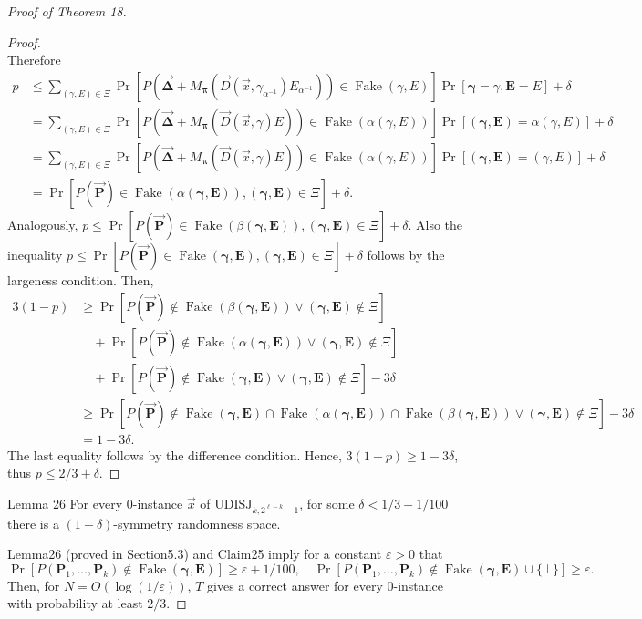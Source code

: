 \begin{proof}[Proof of Theorem 18]
\begin{proof}
\[\]
Therefore
\begin{align*}
p&\le\sum_{(\gamma,E)\in\Xi}\Pr[P(\boldsymbol{\vec\Delta}+M_{\boldsymbol\pi}(\vec D(\vec x,\gamma_{\alpha^{-1}})E_{\alpha^{-1}}))\in\operatorname{Fake}(\gamma,E)]\Pr[\boldsymbol\gamma=\gamma,\mathbf E=E]+\delta\\
&=\sum_{(\gamma,E)\in\Xi}\Pr[P(\boldsymbol{\vec\Delta}+M_{\boldsymbol\pi}(\vec D(\vec x,\gamma)E))\in\operatorname{Fake}(\alpha(\gamma,E))]\Pr[(\boldsymbol\gamma,\mathbf E)=\alpha(\gamma,E)]+\delta\\
&=\sum_{(\gamma,E)\in\Xi}\Pr[P(\boldsymbol{\vec\Delta}+M_{\boldsymbol\pi}(\vec D(\vec x,\gamma)E))\in\operatorname{Fake}(\alpha(\gamma,E))]\Pr[(\boldsymbol\gamma,\mathbf E)=(\gamma,E)]+\delta\\
&=\Pr[P(\boldsymbol{\vec P})\in\operatorname{Fake}(\alpha(\boldsymbol\gamma,\mathbf E)),(\boldsymbol\gamma,\mathbf E)\in\Xi]+\delta .
\end{align*}
Analogously, $p\le\Pr[P(\boldsymbol{\vec P})\in\operatorname{Fake}(\beta(\boldsymbol\gamma,\mathbf E)),(\boldsymbol\gamma,\mathbf E)\in\Xi]+\delta$. Also the inequality $p\le\Pr[P(\boldsymbol{\vec P})\in\operatorname{Fake}(\boldsymbol\gamma,\mathbf E),(\boldsymbol\gamma,\mathbf E)\in\Xi]+\delta$ follows by the largeness condition. Then,
\begin{align*}
3(1-p)&\ge\Pr[P(\boldsymbol{\vec P})\notin\operatorname{Fake}(\beta(\boldsymbol\gamma,\mathbf E))\vee(\boldsymbol\gamma,\mathbf E)\notin\Xi]\\
&\quad+\Pr[P(\boldsymbol{\vec P})\notin\operatorname{Fake}(\alpha(\boldsymbol\gamma,\mathbf E))\vee(\boldsymbol\gamma,\mathbf E)\notin\Xi]\\
&\quad+\Pr[P(\boldsymbol{\vec P})\notin\operatorname{Fake}(\boldsymbol\gamma,\mathbf E)\vee(\boldsymbol\gamma,\mathbf E)\notin\Xi]-3\delta\\
&\ge\Pr[P(\boldsymbol{\vec P})\notin\operatorname{Fake}(\boldsymbol\gamma,\mathbf E)\cap\operatorname{Fake}(\alpha(\boldsymbol\gamma,\mathbf E))\cap\operatorname{Fake}(\beta(\boldsymbol\gamma,\mathbf E))\vee(\boldsymbol\gamma,\mathbf E)\notin\Xi]-3\delta\\
&=1-3\delta .
\end{align*}
The last equality follows by the difference condition. Hence, $3(1-p)\ge1-3\delta$, thus $p\le2/3+\delta$.
\end{proof}
\begin{authorclaim}{Lemma 26}
For every 0-instance $\vec x$ of $\mathrm{UDISJ}_{k,2^{\ell-k}-1}$, for some $\delta<1/3-1/100$ there is a $(1-\delta)$-symmetry randomness space.
\end{authorclaim}
Lemma26 (proved in Section5.3) and Claim25 imply for a constant $\varepsilon>0$ that
\[
\Pr[P(\mathbf P_1,\ldots,\mathbf P_k)\notin\operatorname{Fake}(\boldsymbol\gamma,\mathbf E)]\ge\varepsilon+1/100,
\quad
\Pr[P(\mathbf P_1,\ldots,\mathbf P_k)\notin\operatorname{Fake}(\boldsymbol\gamma,\mathbf E)\cup\{\bot\}]\ge\varepsilon .
\]
Then, for $N=O(\log(1/\varepsilon))$, $T$ gives a correct answer for every 0-instance with probability at least $2/3$.
\end{proof}
